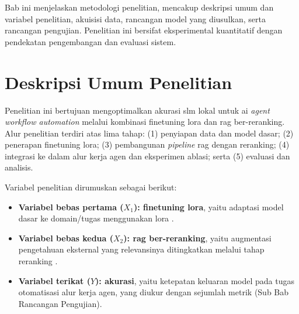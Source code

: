 Bab ini menjelaskan metodologi penelitian, mencakup deskripsi umum dan variabel penelitian, akuisisi data, rancangan model yang diusulkan, serta rancangan pengujian. Penelitian ini bersifat eksperimental kuantitatif dengan pendekatan pengembangan dan evaluasi sistem.

\section{Deskripsi Umum Penelitian}
Penelitian ini bertujuan mengoptimalkan akurasi \gls{slm} lokal untuk \gls{ai} \textit{agent workflow automation} melalui kombinasi \gls{finetuning} \gls{lora} dan \gls{rag} ber-\gls{reranking}. Alur penelitian terdiri atas lima tahap: (1) penyiapan data dan model dasar; (2) penerapan \gls{finetuning} \gls{lora}; (3) pembangunan \textit{pipeline} \gls{rag} dengan \gls{reranking}; (4) integrasi ke dalam alur kerja agen dan eksperimen ablasi; serta (5) evaluasi dan analisis.

Variabel penelitian dirumuskan sebagai berikut:
\begin{itemize}
    \item \textbf{Variabel bebas pertama ($X_1$): \gls{finetuning} \gls{lora}}, yaitu adaptasi model dasar ke domain/tugas menggunakan \gls{lora} \citep{hu2022lora}.
    \item \textbf{Variabel bebas kedua ($X_2$): \gls{rag} ber-\gls{reranking}}, yaitu augmentasi pengetahuan eksternal yang relevansinya ditingkatkan melalui tahap \gls{reranking} \citep{lewis2020rag, sun2023rankgpt}.
    \item \textbf{Variabel terikat ($Y$): akurasi}, yaitu ketepatan keluaran model pada tugas otomatisasi alur kerja agen, yang diukur dengan sejumlah metrik (Sub Bab Rancangan Pengujian).
\end{itemize}

